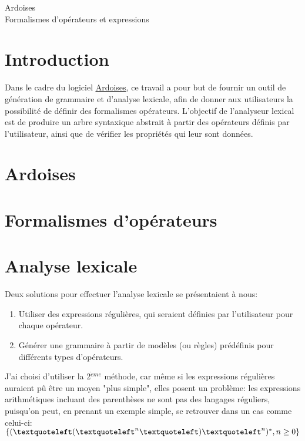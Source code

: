 \documentclass{article}
\begin{document}
\begin{center}
	\huge 
	Ardoises \\
	Formalismes d'opérateurs et expressions
\end{center}
\renewcommand{\contentsname}{Sommaire}
\tableofcontents
\newpage

\section{Introduction}
Dans le cadre du logiciel \underline{\href{https://ardoises.ovh/overview}{Ardoises}}, ce travail a pour but de fournir un outil de génération de grammaire et d'analyse lexicale, afin de donner aux utilisateurs la possibilité de définir des formalismes opérateurs. L'objectif de l'analyseur lexical est de produire un arbre syntaxique abstrait à partir des opérateurs définis par l'utilisateur, ainsi que de vérifier les propriétés qui leur sont données.
\section{Ardoises}
\section{Formalismes d'opérateurs}
\section{Analyse lexicale}
Deux solutions pour effectuer l'analyse lexicale se présentaient à nous:
\begin{enumerate}
	\item Utiliser des expressions régulières, qui seraient définies par l'utilisateur pour chaque opérateur.
	\item Générer une grammaire à partir de modèles (ou règles) prédéfinis pour différents types d'opérateurs.
\end{enumerate}
J'ai choisi d'utiliser la 2$^{\grave{e}me}$ méthode, car même si les expressions régulières auraient pû être un moyen "plus simple", elles posent un problème: les expressions arithmétiques incluant des parenthèses ne sont pas des langages réguliers, puisqu'on peut, en prenant un exemple simple, se retrouver dans un cas comme celui-ci: $\{(\textquoteleft(\textquoteleft^{n}\textquoteleft)\textquoteleft^{n})^{*}, n \ge 0 \}$
\end{document}
